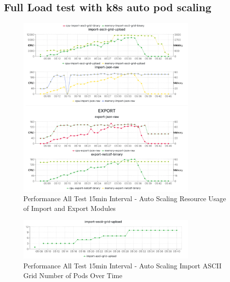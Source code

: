 \subsection{Full Load test with \acrfull{k8s} auto pod scaling}
\label{subse:obs_test_plan_all_auto_15min}
\begin{figure}[htp]
    \centering
    \includegraphics[width=0.8\textwidth]{results/obs/all_auto/obs_all_auto_15m_import_export_res.png}
    \caption{Performance All Test 15min Interval - Auto Scaling Resource Usage of Import and Export Modules }
    \label{fi:obs_all_auto_15m_import_export_res}
\end{figure}

\begin{figure}[htp]
    \centering
    \includegraphics[width=0.8\textwidth]{results/obs/all_auto/obs_all_auto_15m_import_grid_pod.png}
    \caption{Performance All Test 15min Interval - Auto Scaling Import ASCII Grid Number of Pods Over Time }
    \label{fi:obs_all_auto_15m_import_grid_pod}
\end{figure}

